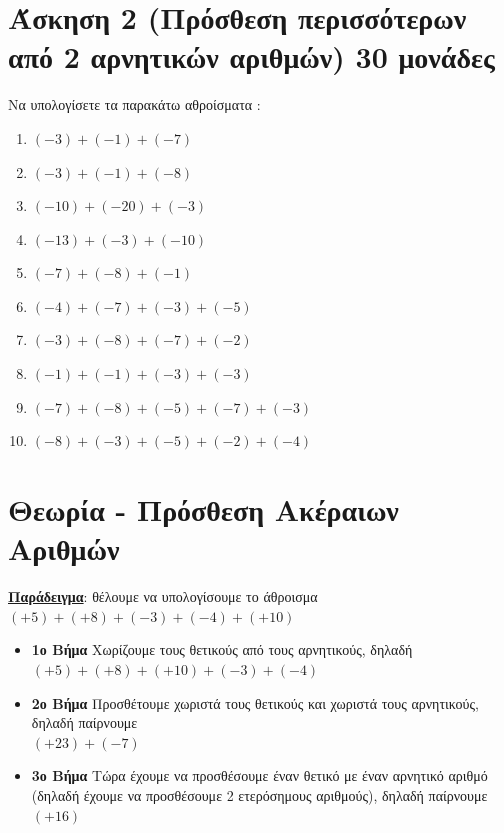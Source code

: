 \documentclass[a4paper,10pt]{report}
\begin{document}
\section*{Άσκηση 2 (Πρόσθεση περισσότερων από 2 αρνητικών αριθμών) \hfill \small{30 μονάδες}}
Να υπολογίσετε τα παρακάτω αθροίσματα :
\begin{enumerate}[1)]
 \item $(-3)+(-1)+(-7)$
 \item $(-3)+(-1)+(-8)$
 \item $(-10)+(-20)+(-3)$
 \item $(-13)+(-3)+(-10)$
 \item $(-7)+(-8)+(-1)$
 \item $(-4)+(-7)+(-3)+(-5)$
 \item $(-3)+(-8)+(-7)+(-2)$
 \item $(-1)+(-1)+(-3)+(-3)$
 \item $(-7)+(-8)+(-5)+(-7)+(-3)$
 \item $(-8)+(-3)+(-5)+(-2)+(-4)$
\end{enumerate}


\section*{Θεωρία - Πρόσθεση Ακέραιων Αριθμών\hfill \small{}}
\textbf{\underline{Παράδειγμα}}: θέλουμε να υπολογίσουμε το άθροισμα 
$(+5)+(+8)+(-3)+(-4)+(+10)$
\begin{itemize}
 \item \textbf{1ο Βήμα} Χωρίζουμε τους θετικούς από τους αρνητικούς, 
                        δηλαδή \\$(+5)+(+8)+(+10)+(-3)+(-4)$
 \item \textbf{2ο Βήμα} Προσθέτουμε χωριστά τους θετικούς και χωριστά τους αρνητικούς, δηλαδή παίρνουμε \\
                         $(+23)+(-7)$
 \item \textbf{3ο Βήμα} Τώρα έχουμε να προσθέσουμε έναν θετικό με έναν αρνητικό αριθμό 
                        (δηλαδή έχουμε να προσθέσουμε 2 ετερόσημους αριθμούς), δηλαδή παίρνουμε \\
                         $(+16)$
\end{itemize}
\end{document}
